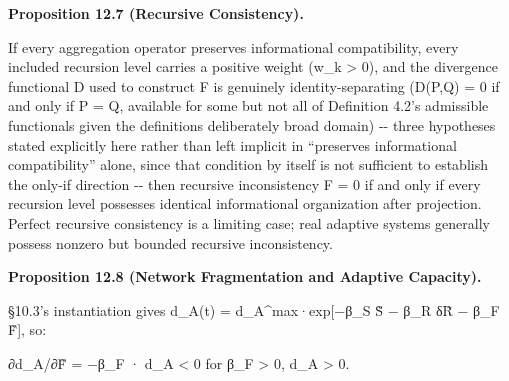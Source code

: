 \documentclass[
]{article}
\begin{document}
\textbf{Proposition 12.7 (Recursive Consistency).}

If every aggregation operator preserves informational compatibility,
every included recursion level carries a positive weight (w\_k
\textgreater{} 0), and the divergence functional D used to construct F
is genuinely identity-separating (D(P,Q) = 0 if and only if P = Q,
available for some but not all of Definition 4.2's admissible
functionals given the definitions deliberately broad domain) -\/- three
hypotheses stated explicitly here rather than left implicit in
``preserves informational compatibility'' alone, since that condition by
itself is not sufficient to establish the only-if direction -\/- then
recursive inconsistency F = 0 if and only if every recursion level
possesses identical informational organization after projection. Perfect
recursive consistency is a limiting case; real adaptive systems
generally possess nonzero but bounded recursive inconsistency.

\textbf{Proposition 12.8 (Network Fragmentation and Adaptive Capacity).}

§10.3's instantiation gives d\_A(t) = d\_A\^{}max·exp{[}−β\_S S̃ − β\_R
δR̃ − β\_F F̃{]}, so:

∂d\_A/∂F̃ = −β\_F · d\_A \textless{} 0 for β\_F \textgreater{} 0, d\_A
\textgreater{} 0.
\end{document}

